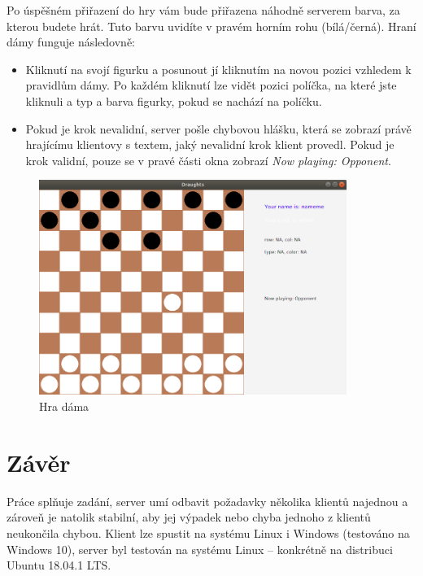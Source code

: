 \documentclass[12pt, a4paper]{article}
\begin{document}
\newline
Po úspěšném přiřazení do hry vám bude přiřazena náhodně serverem barva, za kterou budete hrát. Tuto barvu uvidíte v pravém horním rohu (bílá/černá). Hraní dámy funguje následovně: 
\begin{itemize}
\item Kliknutí na svojí figurku a posunout jí kliknutím na novou pozici vzhledem k pravidlům dámy. Po každém kliknutí lze vidět pozici políčka, na které jste kliknuli a typ a barva figurky, pokud se nachází na políčku.
\item Pokud je krok nevalidní, server pošle chybovou hlášku, která se zobrazí právě hrajícímu klientovy s textem, jaký nevalidní krok klient provedl. Pokud je krok validní, pouze se v pravé části okna zobrazí \textit{Now playing: Opponent}.
\end{itemize}
\begin {figure}[h]
\centering
\includegraphics[width=10cm]{img/ingame}
\caption{Hra dáma}
\label{fig:hra}
\end {figure}
\section{Závěr}
Práce splňuje zadání, server umí odbavit požadavky několika klientů najednou a zároveň je natolik stabilní, aby jej výpadek nebo chyba jednoho z klientů neukončila chybou. Klient lze spustit na systému Linux i Windows (testováno na Windows 10), server byl testován na systému Linux – konkrétně na distribuci Ubuntu 18.04.1 LTS.
\end{document}
